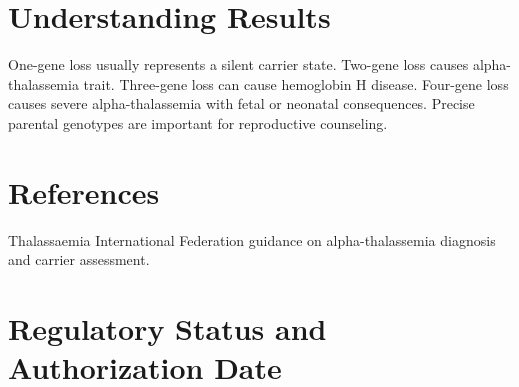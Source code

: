 \section*{Understanding Results}
One-gene loss usually represents a silent carrier state. Two-gene loss causes alpha-thalassemia trait. Three-gene loss can cause hemoglobin H disease. Four-gene loss causes severe alpha-thalassemia with fetal or neonatal consequences. Precise parental genotypes are important for reproductive counseling.

\section*{References}
Thalassaemia International Federation guidance on alpha-thalassemia diagnosis and carrier assessment.

\clearpage


\section*{Regulatory Status and Authorization Date}

\clearpage
